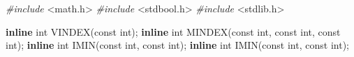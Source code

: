 \documentclass[
  12pt,
]{book}
\newenvironment{Shaded}{\begin{snugshade}}{\end{snugshade}}
\newcommand{\DataTypeTok}[1]{\textcolor[rgb]{0.13,0.29,0.53}{#1}}
\newcommand{\ImportTok}[1]{#1}
\newcommand{\KeywordTok}[1]{\textcolor[rgb]{0.13,0.29,0.53}{\textbf{#1}}}
\newcommand{\NormalTok}[1]{#1}
\newcommand{\PreprocessorTok}[1]{\textcolor[rgb]{0.56,0.35,0.01}{\textit{#1}}}
\theoremstyle{definition}
\theoremstyle{definition}
\theoremstyle{definition}
\theoremstyle{definition}
\theoremstyle{remark}
\begin{document}
\begin{Shaded}
\begin{Highlighting}[]

\PreprocessorTok{\#include }\ImportTok{\textless{}math.h\textgreater{}}
\PreprocessorTok{\#include }\ImportTok{\textless{}stdbool.h\textgreater{}}
\PreprocessorTok{\#include }\ImportTok{\textless{}stdlib.h\textgreater{}}

\KeywordTok{inline} \DataTypeTok{int}\NormalTok{ VINDEX(}\DataTypeTok{const} \DataTypeTok{int}\NormalTok{);}
\KeywordTok{inline} \DataTypeTok{int}\NormalTok{ MINDEX(}\DataTypeTok{const} \DataTypeTok{int}\NormalTok{, }\DataTypeTok{const} \DataTypeTok{int}\NormalTok{, }\DataTypeTok{const} \DataTypeTok{int}\NormalTok{);}
\KeywordTok{inline} \DataTypeTok{int}\NormalTok{ IMIN(}\DataTypeTok{const} \DataTypeTok{int}\NormalTok{, }\DataTypeTok{const} \DataTypeTok{int}\NormalTok{);}
\KeywordTok{inline} \DataTypeTok{int}\NormalTok{ IMIN(}\DataTypeTok{const} \DataTypeTok{int}\NormalTok{, }\DataTypeTok{const} \DataTypeTok{int}\NormalTok{);}


\end{Highlighting}
\end{Shaded}
\end{document}
